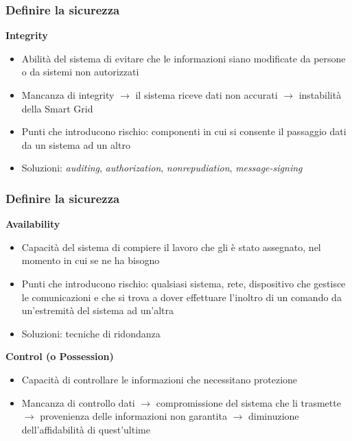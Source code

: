 \begin{frame}
  \frametitle{Definire la sicurezza}
   \textbf{Integrity}
  	\begin{itemize}[<+- | alert@+>]
  	\item Abilità del sistema di evitare che le informazioni siano modificate da persone o da sistemi non autorizzati
  	\item Mancanza di integrity $\rightarrow$ il sistema riceve dati non accurati $\rightarrow$ instabilità della Smart Grid
  	\item Punti che introducono rischio: componenti in cui si consente il passaggio dati da un sistema ad un altro
  	\item Soluzioni: \textit{auditing}, \textit{authorization}, \textit{nonrepudiation}, \textit{message-signing}
  	\end{itemize}
\end{frame}

\begin{frame}
  \frametitle{Definire la sicurezza}
   \textbf{Availability}
  	\begin{itemize}[<+- | alert@+>]
  	\item Capacità del sistema di compiere il lavoro che gli è stato assegnato, nel momento in cui se ne ha bisogno 
  	\item Punti che introducono rischio: qualsiasi sistema, rete, dispositivo che gestisce le comunicazioni e che si trova a dover effettuare l'inoltro di un comando da un’estremità del sistema ad un’altra
  	\item Soluzioni: tecniche di ridondanza
  	\end{itemize}
  	\pause
   \textbf{Control (o Possession)}
  	\begin{itemize}[<+- | alert@+>]
  	\item Capacità di controllare le informazioni che necessitano protezione
  	\item Mancanza di controllo dati $\rightarrow$  compromissione del sistema che li trasmette $\rightarrow$ provenienza delle informazioni non garantita $\rightarrow$ diminuzione dell'affidabilità di quest'ultime
  	\end{itemize}
\end{frame}

